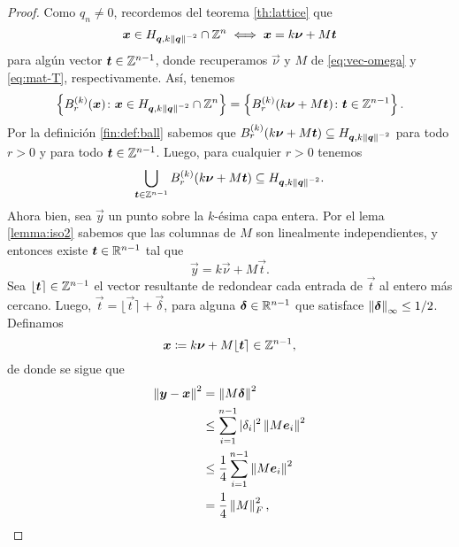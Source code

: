 \begin{proof}
	Como $q_n \neq 0$, recordemos del teorema \eqref{th:lattice} que
	\begin{equation*}
		\boldsymbol{x} \in H_{\boldsymbol{q}, k\left\lVert \boldsymbol{q} \right\rVert^{-2}} \cap \mathbb{Z}^n \iff \boldsymbol{x} = k\boldsymbol{\nu} + M\boldsymbol{t}
	\end{equation*}
	para algún vector $\boldsymbol{t} \in \mathbb{Z}^{n-1}$, donde recuperamos $\vec{\nu}$ y $M$ de
	\eqref{eq:vec-omega} y \eqref{eq:mat-T}, respectivamente. Así, tenemos
	\begin{equation*}
		\left\lbrace B_r^{(k)}(\boldsymbol{x}) \colon \boldsymbol{x} \in H_{\boldsymbol{q}, k\left\lVert \boldsymbol{q} \right\rVert^{-2}} \cap
			\mathbb{Z}^n \right\rbrace
			=
		\left\lbrace B_r^{(k)}(k\boldsymbol{\nu} + M\boldsymbol{t}) \colon \boldsymbol{t} \in \mathbb{Z}^{n-1} \right\rbrace.
	\end{equation*}
	Por la definición \ref{fin:def:ball} sabemos que $B_r^{(k)}(k\boldsymbol{\nu} + M\boldsymbol{t}) \subseteq H_{\boldsymbol{q},
	k\left\lVert \boldsymbol{q} \right\rVert^{-2}}$ para todo $r > 0$ y para todo $\boldsymbol{t} \in \mathbb{Z}^{n-1}$. Luego, para
	cualquier $r > 0$ tenemos
	\begin{equation}
		\label{eq:ball-cover:1}
		\bigcup_{\boldsymbol{t} \in \mathbb{Z}^{n-1}}B_r^{(k)}(k\boldsymbol{\nu} + M\boldsymbol{t}) \subseteq
		H_{\boldsymbol{q}, k\left\lVert \boldsymbol{q} \right\rVert^{-2}}.
	\end{equation}
	Ahora bien, sea $\vec{y}$ un punto sobre la $k$-ésima capa entera. Por el lema \ref{lemma:iso2}
	sabemos que las columnas de $M$ son linealmente independientes, y entonces existe $\boldsymbol{t} \in
	\mathbb{R}^{n-1}$ tal que
	\begin{equation*}
		\vec{y} = k\vec{\nu} + M\vec{t}.
	\end{equation*}
	Sea $\lfloor \boldsymbol{t} \rceil \in \mathbb{Z}^{n-1}$ el vector resultante de redondear cada entrada de
	$\vec{t}$ al entero más cercano. Luego, $\vec{t} = \lfloor \vec{t} \rceil + \vec{\delta}$,
	para alguna $\boldsymbol{\delta} \in \mathbb{R}^{n-1}$ que satisface $\left\lVert \boldsymbol{\delta} \right\rVert_{\infty} \leq 1/2$.
	Definamos
	\begin{equation*}
		\boldsymbol{x} \coloneq k\boldsymbol{\nu} + M\lfloor \boldsymbol{t} \rceil \in \mathbb{Z}^{n-1},
	\end{equation*}
	de donde se sigue que
	\begin{align}
		\left\lVert \boldsymbol{y} - \boldsymbol{x} \right\rVert^{2} 
		&= \left\lVert M\boldsymbol{\delta} \right\rVert^{2} \nonumber \\
		&\leq \sum_{i=1}^{n-1}|\delta_i|^2 \left\lVert M\boldsymbol{e}_i \right\rVert^{2} \nonumber \\
		&\leq \frac{1}{4}\sum_{i=1}^{n-1} \left\lVert M\boldsymbol{e}_i \right\rVert^{2} \label{eq:alt-M-bound} \\
		&= \frac{1}{4}\left\lVert M \right\rVert_F^2, \nonumber
	\end{align}

\end{proof}
